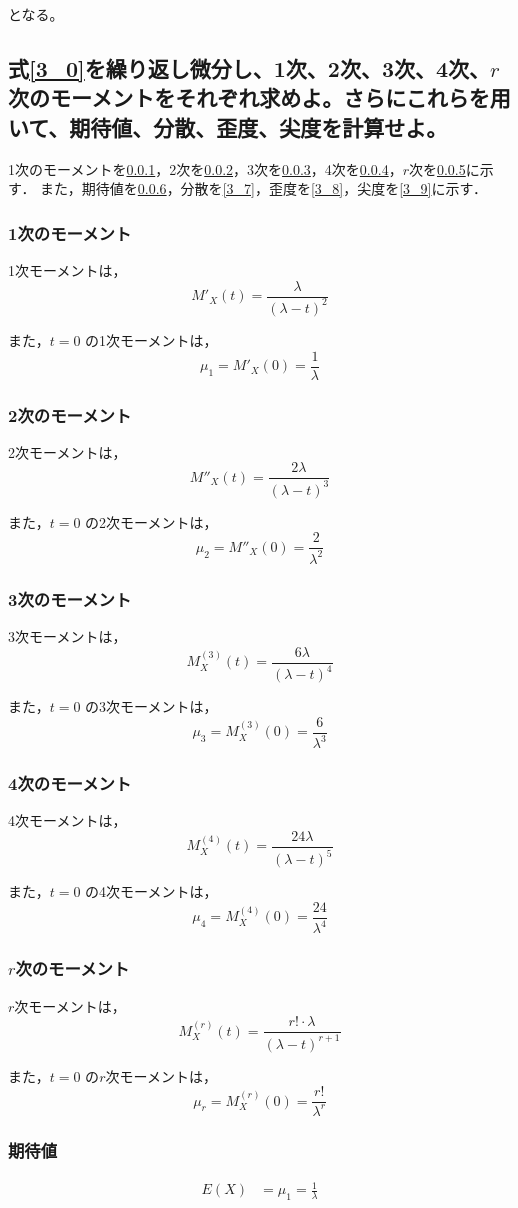 \documentclass[titlepage,a4paper]{jsarticle}
\begin{document}
となる。
\subsection*{式\eqref{3_0}を繰り返し微分し、1次、2次、3次、4次、$r$次のモーメントをそれぞれ求めよ。さらにこれらを用いて、期待値、分散、歪度、尖度を計算せよ。}
1次のモーメントを\ref{3_1}，2次を\ref{3_2}，3次を\ref{3_3}，4次を\ref{3_4}，$r$次を\ref{3_5}に示す．
また，期待値を\ref{3_6}，分散を\ref{3_7}，歪度を\ref{3_8}，尖度を\ref{3_9}に示す．
\subsubsection{1次のモーメント}\label{3_1}
1次モーメントは，
\[
  M'_X(t) = \frac{\lambda}{(\lambda - t)^2}
\]

また，$t = 0$ の1次モーメントは，
\[
  \mu_1 = M'_X(0) = \frac{1}{\lambda}
\]

\subsubsection{2次のモーメント}\label{3_2}
2次モーメントは，
\[
  M''_X(t) = \frac{2\lambda}{(\lambda - t)^3}
\]

また，$t = 0$ の2次モーメントは，
\[
  \mu_2 = M''_X(0) = \frac{2}{\lambda^2}
\]
\subsubsection{3次のモーメント}\label{3_3}
3次モーメントは，
\[
  M^{(3)}_X(t) = \frac{6\lambda}{(\lambda - t)^4}
\]

また，$t = 0$ の3次モーメントは，
\[
  \mu_3 = M^{(3)}_X(0) = \frac{6}{\lambda^3}
\]
\subsubsection{4次のモーメント}\label{3_4}
4次モーメントは，
\[
  M^{(4)}_X(t) = \frac{24\lambda}{(\lambda - t)^5}
\]

また，$t = 0$ の4次モーメントは，
\[
  \mu_4 = M^{(4)}_X(0) = \frac{24}{\lambda^4}
\]
\subsubsection{$r$次のモーメント}\label{3_5}
$r$次モーメントは，
\[
  M^{(r)}_X(t) = \frac{r! \cdot \lambda}{(\lambda - t)^{r+1}}
\]

また，$t = 0$ の$r$次モーメントは，
\[
  \mu_r = M^{(r)}_X(0) = \frac{r!}{\lambda^r}
\]
\subsubsection{期待値}\label{3_6}
\begin{align}
  E(X) & = \mu_1 = \frac{1}{\lambda}
\end{align}
\end{document}
